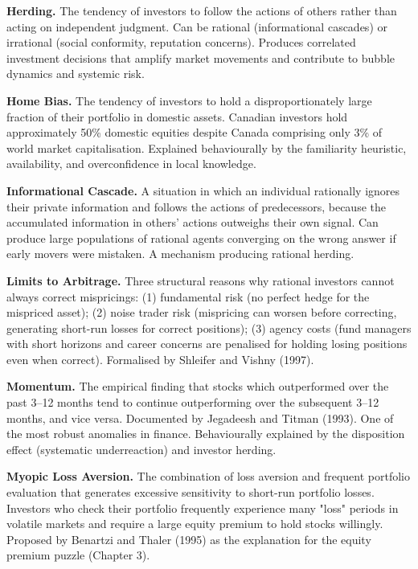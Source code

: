 \documentclass[12pt, letterpaper]{article}
\begin{document}
\textbf{Herding.} The tendency of investors to follow the actions of others rather than acting on independent judgment. Can be rational (informational cascades) or irrational (social conformity, reputation concerns). Produces correlated investment decisions that amplify market movements and contribute to bubble dynamics and systemic risk.

\textbf{Home Bias.} The tendency of investors to hold a disproportionately large fraction of their portfolio in domestic assets. Canadian investors hold approximately 50\% domestic equities despite Canada comprising only 3\% of world market capitalisation. Explained behaviourally by the familiarity heuristic, availability, and overconfidence in local knowledge.

\textbf{Informational Cascade.} A situation in which an individual rationally ignores their private information and follows the actions of predecessors, because the accumulated information in others' actions outweighs their own signal. Can produce large populations of rational agents converging on the wrong answer if early movers were mistaken. A mechanism producing rational herding.

\textbf{Limits to Arbitrage.} Three structural reasons why rational investors cannot always correct mispricings: (1) fundamental risk (no perfect hedge for the mispriced asset); (2) noise trader risk (mispricing can worsen before correcting, generating short-run losses for correct positions); (3) agency costs (fund managers with short horizons and career concerns are penalised for holding losing positions even when correct). Formalised by Shleifer and Vishny (1997).

\textbf{Momentum.} The empirical finding that stocks which outperformed over the past 3--12 months tend to continue outperforming over the subsequent 3--12 months, and vice versa. Documented by Jegadeesh and Titman (1993). One of the most robust anomalies in finance. Behaviourally explained by the disposition effect (systematic underreaction) and investor herding.

\textbf{Myopic Loss Aversion.} The combination of loss aversion and frequent portfolio evaluation that generates excessive sensitivity to short-run portfolio losses. Investors who check their portfolio frequently experience many "loss" periods in volatile markets and require a large equity premium to hold stocks willingly. Proposed by Benartzi and Thaler (1995) as the explanation for the equity premium puzzle (Chapter 3).
\end{document}

